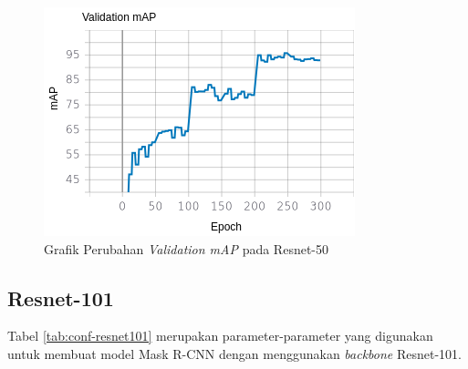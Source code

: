 \begin{figure}[h]
	\centering
	\includegraphics[scale=0.4]{gambar/resnet50-map.png}
	\caption{Grafik Perubahan \textit{Validation mAP} pada Resnet-50}
	\label{fig:resnet50-map}
\end{figure}

\newpage

\subsection{Resnet-101}
\label{subsec:resnet101}

Tabel \ref{tab:conf-resnet101} merupakan parameter-parameter yang digunakan untuk membuat model Mask R-CNN dengan menggunakan \textit{backbone} Resnet-101.

